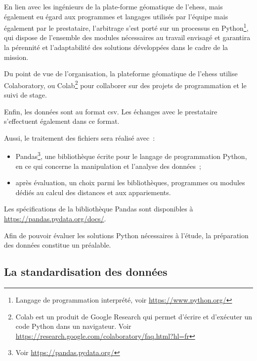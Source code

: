 \documentclass[a4paper,12pt,twoside]{book}
\begin{document}
	               En lien avec les ingénieurs de la plate-forme géomatique de l'\gls{ehess}, mais également eu égard aux programmes et langages utilisés par l'équipe mais également par le prestataire, l'arbitrage s'est porté sur un processus en Python\footnote{Langage de programmation interprété, voir \url{https://www.python.org/}}, qui dispose de l'ensemble des modules nécessaires au travail envisagé et garantira la pérennité et l'adaptabilité des solutions développées dans le cadre de la mission.
	               
	               Du point de vue de l'organisation, la plateforme géomatique de l'\gls{ehess} utilise \og{}Colaboratory\fg{}, ou \og{}Colab\fg{}\footnote{\og{}Colab\fg{} est un produit de Google Research qui permet d'écrire et d'exécuter un code Python dans un navigateur. Voir \url{https://research.google.com/colaboratory/faq.html?hl=fr}} pour collaborer sur des projets de programmation et le suivi de stage.
	               
	               Enfin, les données sont au format \acrshort{csv}. Les échanges avec le prestataire s'effectuent également dans ce format.
	               
	               Aussi, le traitement des fichiers sera réalisé avec~:
	               \vspace{0.8em}
	               \begin{itemize}
	                   \item Pandas\footnote{Voir \url{https://pandas.pydata.org/}}, une bibliothèque écrite pour le langage de programmation Python, en ce qui concerne la manipulation et l'analyse des données~;
	                   \item après évaluation, un choix parmi les bibliothèques, programmes ou modules dédiés au calcul des distances et aux appariements.
	               \end{itemize}
	               \vspace{0.8em}
	               
	               Les spécifications de la bibliothèque Pandas sont disponibles à \url{https://pandas.pydata.org/docs/}.
	               
	               Afin de pouvoir évaluer les solutions Python nécessaires à l'étude, la préparation des données constitue un préalable.
	                
	        \subsection{La standardisation des données}
	            
\end{document}
